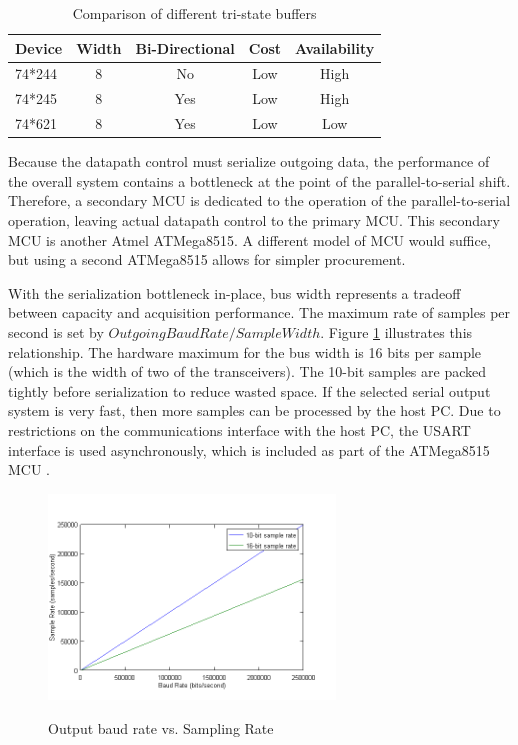 \begin{table}[bhp]
\caption[Buffer Comparison]{Comparison of different tri-state buffers}
\small
\begin{center}
\begin{tabular}{l| c c c c}
\setlength{\tabcolsep}{1pt}
	Device & Width & Bi-Directional & Cost & Availability \\\hline
	74*244 & 8     & No             & Low  & High\\
	74*245 & 8     & Yes            & Low  & High\\
	74*621 & 8     & Yes            & Low  & Low
\end{tabular}
\end{center}
\label{tab:buffer comparison}
\end{table}

Because the datapath control must serialize outgoing data, the performance
of the overall system contains a bottleneck at the point of the 
parallel-to-serial shift. Therefore, a secondary MCU is dedicated to
the operation of the parallel-to-serial operation, leaving actual datapath 
control to the primary MCU. This secondary MCU is another Atmel ATMega8515. A
different model of MCU would suffice, but using a second ATMega8515 allows  
for simpler procurement.

With the serialization bottleneck in-place, bus width represents a tradeoff 
between capacity and acquisition performance. The maximum rate of samples per
second is set by ${Outgoing Baud Rate}/{Sample Width}$. Figure \ref{fig:baud rates and sample} 
illustrates this relationship. The hardware maximum for the bus width is 16 bits
per sample (which is the width of two of the transceivers). The 10-bit samples
are packed tightly before serialization to reduce wasted space. If the 
selected serial output system is very fast, then more samples 
can be processed by the host PC. Due to restrictions on the communications 
interface with the host PC, the USART  interface is used 
asynchronously, which is included as part of the ATMega8515 MCU
\cite{ds:ATMEGA8515}.

\begin{figure}[hbp]
\caption[Baud Rate and Samples]{Output baud rate vs. Sampling Rate\cite{ds:ATMEGA8515}}
\includegraphics[width=3in]{baud_rate.png}
\label{fig:baud rates and sample}
\end{figure}
